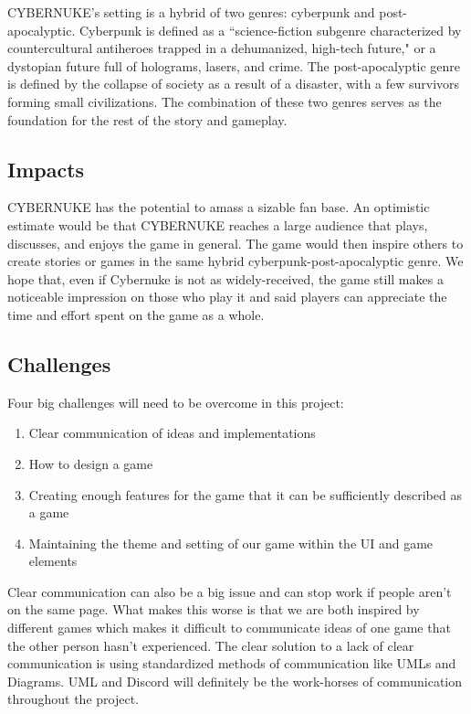 \documentclass[10pt,conference,onecolumn,compsoc]{IEEEtran}
\begin{document}
CYBERNUKE's setting is a hybrid of two genres: cyberpunk and post-apocalyptic.
Cyberpunk is defined as a ``science-fiction subgenre characterized by countercultural antiheroes trapped in a dehumanized, high-tech future,"\cite{IEEEhowto:cyberpunk} or a dystopian future full of holograms, lasers, and crime. The post-apocalyptic genre is defined by the collapse of society as a result of a disaster, with a few survivors forming small civilizations. The combination of these two genres serves as the foundation for the rest of the story and gameplay. 

\subsection{Impacts}
CYBERNUKE has the potential to amass a sizable fan base. An optimistic estimate would be that CYBERNUKE reaches a large audience that plays, discusses, and enjoys the game in general. The game would then inspire others to create stories or games in the same hybrid cyberpunk-post-apocalyptic genre. We hope that, even if Cybernuke is not as widely-received, the game still makes a noticeable impression on those who play it and said players can appreciate the time and effort spent on the game as a whole.

\subsection{Challenges}
Four big challenges will need to be overcome in this project:
\begin{enumerate}
\item Clear communication of ideas and implementations
\item How to design a game
\item Creating enough features for the game that it can be sufficiently described as a game
\item Maintaining the theme and setting of our game within the UI and game elements
\end{enumerate}

Clear communication can also be a big issue and can stop work if people aren't on the same page. What makes this worse is that we are both inspired by different games which makes it difficult to communicate ideas of one game that the other person hasn't experienced. The clear solution to a lack of clear communication is using standardized methods of communication like UMLs and Diagrams. UML and Discord will definitely be the work-horses of communication throughout the project.
\end{document}
